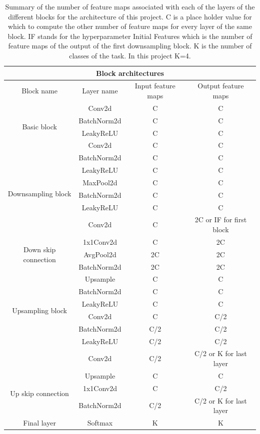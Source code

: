 \begin{table}[!h]
    \centering
    \begin{tabular}{c|ccc}
    \hline
    \multicolumn{4}{c}{Block architectures} \\
    \hline
    \hline
    Block name & Layer name & Input feature maps & Output feature maps \\
    \hline
          \multirow{4}{*}{Basic block} & Conv2d & C & C \\
          & BatchNorm2d & C & C \\
          & LeakyReLU & C & C \\
          & Conv2d & C & C \\
          \hline
         \multirow{6}{*}{Downsampling block}& BatchNorm2d & C & C \\
         & LeakyReLU & C & C \\
         & MaxPool2d & C & C \\
         & BatchNorm2d & C & C \\
         & LeakyReLU & C & C \\
         & Conv2d & C & 2C or IF for first block \\
         \hline
         \multirow{3}{*}{Down skip connection} & 1x1Conv2d & C & 2C \\
         & AvgPool2d & 2C & 2C \\
         & BatchNorm2d & 2C & 2C \\
         \hline
         \multirow{6}{*}{Upsampling block}& Upsample & C & C \\
         & BatchNorm2d & C & C \\
         & LeakyReLU & C & C \\
         & Conv2d & C & C/2 \\
         & BatchNorm2d & C/2 & C/2 \\
         & LeakyReLU & C/2 & C/2 \\
         & Conv2d & C/2 & C/2 or K for last layer \\
         \hline
         \multirow{3}{*}{Up skip connection} & Upsample & C & C \\
         & 1x1Conv2d & C & C/2 \\
         & BatchNorm2d & C/2 & C/2 or K for last layer \\
         \hline
         Final layer & Softmax & K & K \\
         \hline
    \end{tabular}
    \caption{Summary of the number of feature maps associated with each of the layers of the different blocks for the architecture of this project. C is a place holder value for which to compute the other number of feature maps for every layer of the same block. IF stands for the hyperparameter Initial Features which is the number of feature maps of the output of the first downsampling block. K is the number of classes of the task. In this project K=4.}
    \label{tab:blocks}
\end{table}

